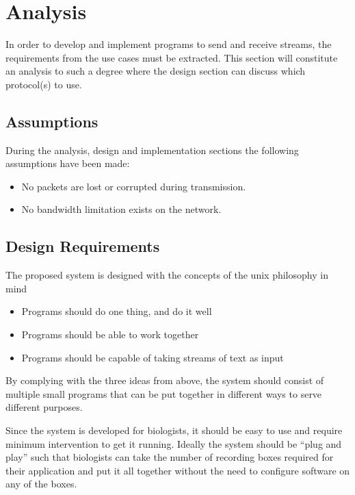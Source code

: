 \chapter{Analysis}
In order to develop and implement programs to send and receive streams, the requirements from the use cases must be extracted.
This section will constitute an analysis to such a degree where the design section can discuss which protocol(s) to use.

\section{Assumptions}
During the analysis, design and implementation sections the following assumptions have been made:
\begin{itemize}
	\item No packets are lost or corrupted during transmission.
	\item No bandwidth limitation exists on the network.
\end{itemize}

\section{Design Requirements}
The proposed system is designed with the concepts of the unix philosophy in mind
\begin{itemize}
	\item Programs should do one thing, and do it well
	\item Programs should be able to work together
	\item Programs should be capable of taking streams of text as input
\end{itemize}

By complying with the three ideas from above, the system should consist of multiple small programs that can be put together in different ways to serve different purposes.

Since the system is developed for biologists, it should be easy to use and require minimum intervention to get it running. Ideally the system should be “plug and play” such that biologists can take the number of recording boxes required for their application and put it all together without the need to configure software on any of the boxes. 

